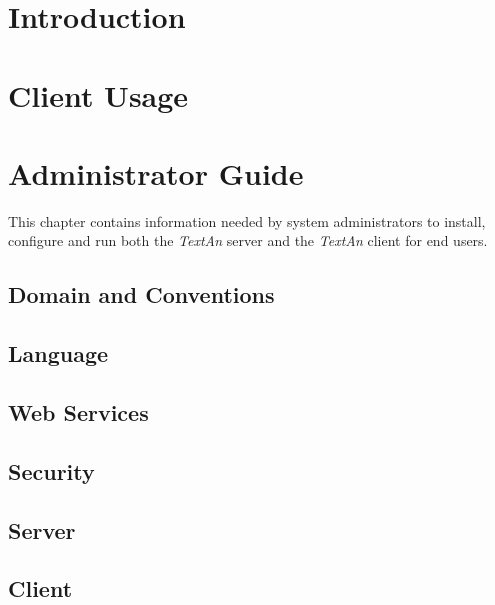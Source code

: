 \documentclass[12pt,a4paper]{report}
\makeatletter
\newcommand{\comment}[3][\@empty]{%
}
\newcommand{\textan}{\emph{TextAn}}
\makeatother
\begin{document}
\chapter{Introduction}


\chapter{Client Usage}
\label{sec:ClientUsage}


\chapter{Administrator Guide}
\label{sec:AdminGuide}

This chapter contains information needed by system administrators to install,
configure and run both the \textan{} server and the \textan{} client for end
users.

\comment{Adam}{I think the sections Language and Security should be placed
after the Server and Client sections as they mention changing configuration
that it is not explained yet.}

\section{Domain and Conventions}

\label{sec:Domain}

\section{Language}
\label{sec:Lang}


\section{Web Services}


\section{Security}
\label{sec:Security}


\section{Server}
\label{sec:Server}


\section{Client}
\label{sec:Client}

\end{document}
